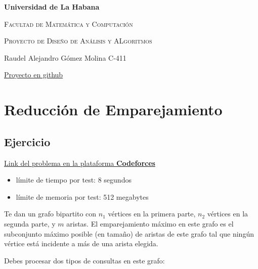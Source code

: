 \documentclass{article}
\begin{document}
\begin{titlepage}
    \centering
    {\bfseries\LARGE Universidad de La Habana \par}
    \vspace{1cm}
    {\scshape\Large Facultad de Matemática y Computación \par}
    \vspace{3cm}
    {\scshape\Huge Proyecto de Diseño de Análisis y ALgoritmos\par}
    \vfill

    {\Large Raudel Alejandro Gómez Molina C-411 \par}
    \vfill
    {\href{https://github.com/raudel25/DAA-Project}{Proyecto en github} \par}
\end{titlepage}

\tableofcontents

\newpage

\section{Reducción de Emparejamiento}

\subsection{Ejercicio}

\href{https://codeforces.com/contest/1721/problem/F}{Link del problema en la plataforma \textbf{Codeforces}}

\begin{itemize}
    \item límite de tiempo por test: 8 segundos
    \item límite de memoria por test: 512 megabytes
\end{itemize}

Te dan un grafo bipartito con $n_1$ vértices en la primera parte, $n_2$ vértices en la segunda parte, y $m$ aristas. El emparejamiento máximo en este grafo es el subconjunto máximo posible (en tamaño) de aristas de este grafo tal que ningún vértice está incidente a más de una arista elegida.

Debes procesar dos tipos de consultas en este grafo:
\end{document}
